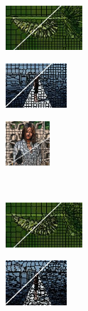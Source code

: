 \begin{figure}
\begin{subfigure}[b]{0.02\textwidth}
	\end{subfigure}
	\begin{subfigure}[b]{0.16\textwidth}
		\includegraphics[height=1.65cm]{pictures/bsds500/mss/cropped/mss_35028_contours}
	\end{subfigure}
	\begin{subfigure}[b]{0.129\textwidth}
		\includegraphics[height=1.65cm]{pictures/sbd/mss/cropped/mss_0004774_contours}
	\end{subfigure}
	\begin{subfigure}[b]{0.10\textwidth}
		\includegraphics[height=1.65cm]{pictures/fash/mss/cropped/mss_010_contours}
	\end{subfigure}\\
	\begin{subfigure}[b]{0.02\textwidth}
	\end{subfigure}
	\begin{subfigure}[b]{0.16\textwidth}
		\includegraphics[height=1.65cm]{pictures/bsds500/preslic/cropped/preslic_35028_contours}
	\end{subfigure}
	\begin{subfigure}[b]{0.129\textwidth}
		\includegraphics[height=1.65cm]{pictures/sbd/preslic/cropped/preslic_0004774_contours}
	\end{subfigure}

\end{figure}
